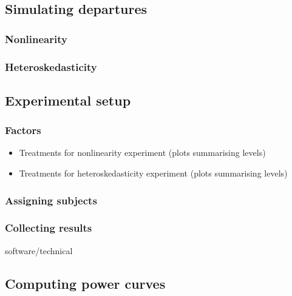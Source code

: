 \documentclass[]{interact}
\theoremstyle{plain}%
\theoremstyle{definition}
\theoremstyle{remark}
\def\tightlist{}
\begin{document}
\hypertarget{simulating-departures}{%
\subsection{Simulating departures}\label{simulating-departures}}

\hypertarget{nonlinearity}{%
\subsubsection{Nonlinearity}\label{nonlinearity}}

\hypertarget{heteroskedasticity}{%
\subsubsection{Heteroskedasticity}\label{heteroskedasticity}}

\hypertarget{experimental-setup}{%
\subsection{Experimental setup}\label{experimental-setup}}

\hypertarget{factors}{%
\subsubsection{Factors}\label{factors}}

\begin{itemize}
\tightlist
\item
  Treatments for nonlinearity experiment (plots summarising levels)
\item
  Treatments for heteroskedasticity experiment (plots summarising
  levels)
\end{itemize}

\hypertarget{assigning-subjects}{%
\subsubsection{Assigning subjects}\label{assigning-subjects}}

\hypertarget{collecting-results}{%
\subsubsection{Collecting results}\label{collecting-results}}

software/technical

\hypertarget{computing-power-curves}{%
\subsection{Computing power curves}\label{computing-power-curves}}
\end{document}
